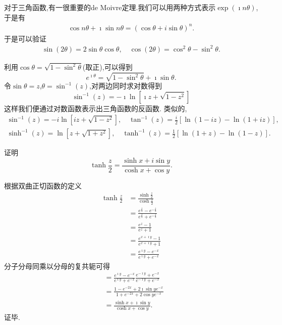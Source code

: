 对于三角函数,有一很重要的de Moivre定理.我们可以用两种方式表示$\exp(\imath n \theta)$,于是有
\begin{align}
    \cos n \theta + \imath \sin n\theta = (\cos \theta + i \sin \theta)^n  .
\end{align}
于是可以验证
\begin{align}
    \sin(2\theta) = 2\sin\theta \cos\theta, \quad \cos (2\theta) = \cos^2\theta - \sin^2\theta .
\end{align}

利用$\cos \theta = \sqrt{1 - \sin ^2 \theta }$(取正),可以得到
\begin{equation}
  e^{\imath \theta} = \sqrt{ 1 - \sin ^2 \theta } + \imath \sin \theta .  
\end{equation} 
令$\sin \theta = z$,$\theta = \sin^{-1} (z)$,对两边同时求对数得到
\begin{equation}
    \sin^{-1} (z) = -\imath \ln \left[ \imath z + \sqrt{1-z^2} \right]
\end{equation}
这样我们便通过对数函数表示出三角函数的反函数.
类似的,
\begin{equation}
    \begin{array}{cc}
    \sin ^{-1}(z)=-i \ln \left[i z+\sqrt{1-z^2}\right], \quad \tan ^{-1}(z)=\frac{i}{2}[\ln (1-i z)-\ln (1+i z)], \\
    \sinh ^{-1}(z)=\ln \left[z+\sqrt{1+z^2}\right], \quad \tanh ^{-1}(z)=\frac{1}{2}[\ln (1+z)-\ln (1-z)] .
    \end{array}
\end{equation}

\begin{example}
    证明
    \[
        \tanh \frac{z}{2}=\frac{\sinh x+i \sin y}{\cosh x+\cos y} .  
    \]
\end{example}
\begin{solution}
根据双曲正切函数的定义
\begin{align*}
    \tanh \frac{z}{2} &= \frac{\sinh \frac{z}{2} }{ \cosh \frac{z}{2}}
    \\
    &= \frac{e^{\frac{z}{2}} - e^{-\frac{z}{2}}}{e^{\frac{z}{2}} + e^{-\frac{z}{2}}}
    \\
    &= \frac{e^{z} - 1}{e^{z} + 1} 
    \\
    &= \frac{e^{x+\imath y } -1 } { e^{x + \imath y } + 1}
    \\
    &=\frac{e^{\imath y } -e^{-x} } { e^{\imath y } + e^{-x}}
\end{align*}   
分子分母同乘以分母的复共轭可得
\begin{align*}
    &=\frac{e^{\imath y } -e^{-x} } { e^{\imath y } + e^{-x}} \frac{e^{-\imath y } + e^{-x}} { e^{-\imath y } + e^{-x}}
    \\
    &=\frac{ 1 - e^{-2x} + 2 \imath \sin y e^{-x}}{1+ e^{-2x} + 2 \cos y e^{-x} }
    \\
    &= \frac{\sinh x + \imath \sin y} {\cosh x + \cos y} .  
\end{align*}
证毕.
\end{solution}

